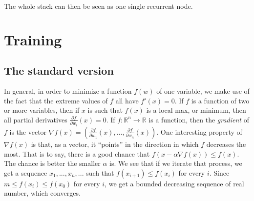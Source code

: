 \documentclass[10pt]{amsart}
\newcommand{\R}{\mathbb{R}}
\theoremstyle{definition}
\begin{document}
\begin{center}
\end{center}

The whole stack can then be seen as one single recurrent node.

\section{Training}

\subsection{The standard version} In general, in order to minimize a function $f(w)$ of one variable, we make use of the fact that the extreme values of $f$ all have $f'(x)=0$.  If $f$ is a function of two or more variables, then if $x$ is such that $f(x)$ is a local max, or minimum, then all partial derivatives $\frac{\partial f}{\partial w_i}(x)=0$.  If $f:\R^n\to\R$ is a function, then the {\em gradient} of $f$ is the vector $\nabla f(x) = \left(\frac{\partial f}{\partial w_1}(x),...,\frac{\partial f}{\partial w_n}(x)\right)$. One interesting property of $\nabla f(x)$ is that, as a vector, it ``points'' in the direction in which $f$ decreases the most.  That is to say, there is a good chance that $f(x-\alpha\nabla f(x))\leq f(x)$. The chance is better the smaller $\alpha$ is.  We see that if we iterate that process, we get a sequence $x_1,...,x_n,...$ such that $f(x_{i+1})\leq f(x_i)$ for every $i$.  Since $m\leq f(x_i)\leq f(x_0)$ for every $i$, we get a bounded decreasing sequence of real number, which converges.
\end{document}
